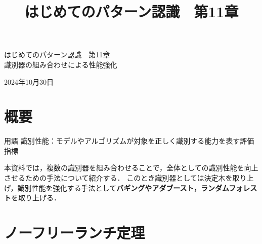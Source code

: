 \documentclass[dvipdfmx]{jreport}
\title{はじめてのパターン認識　第11章}
\begin{document}
\begin{center}{
        \large{はじめてのパターン認識　第11章}\\
        \Large{識別器の組み合わせによる性能強化}
}
\end{center}

\begin{flushright}
    2024年10月30日\\
\end{flushright}



\section{概要}
\begin{itembox}[l]{\large{用語}}
        \hspace{15pt} \raisebox{0.5ex}{\tiny $\bullet$} 識別性能：モデルやアルゴリズムが対象を正しく識別する能力を表す評価指標
\end{itembox}

本資料では，複数の識別器を組み合わせることで，全体としての識別性能を向上させるための手法について紹介する．
このとき識別器としては決定木を取り上げ，識別性能を強化する手法として\textbf{バギングやアダブースト，ランダムフォレスト}を取り上げる．

\section{ノーフリーランチ定理}
\end{document}
